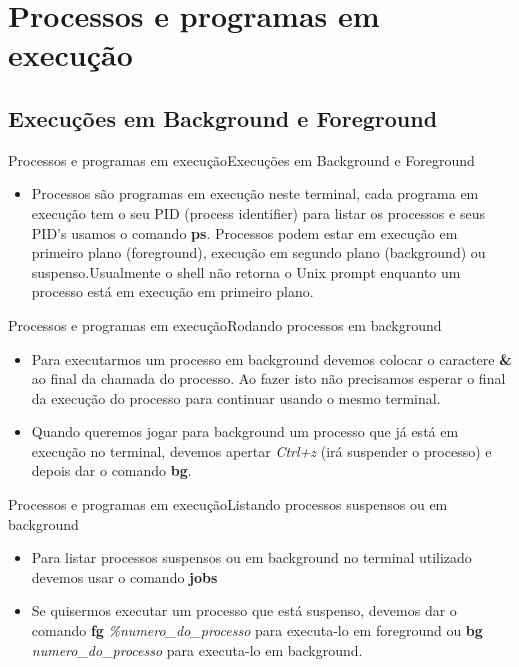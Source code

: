 \documentclass{beamer}
\begin{document}
\section{Processos e programas em execu\c{c}ão}
\subsection{Execu\c{c}ões em Background e Foreground}
\begin{frame}{Processos e programas em execu\c{c}ão}{Execu\c{c}ões em Background e Foreground}
  \begin{itemize}
  \item { Processos são programas em execu\c{c}ão neste terminal, cada programa em execu\c{c}ão tem o seu PID (process identifier) para listar os processos e seus PID's usamos o comando \textbf{ps}. Processos podem estar em execu\c{c}ão em primeiro plano (foreground), execu\c{c}ão em segundo plano (background) ou suspenso.Usualmente o shell não retorna o Unix prompt enquanto um processo está em execu\c{c}ão em primeiro plano.
    }\end{itemize}
\end{frame}

\begin{frame}{Processos e programas em execu\c{c}ão}{Rodando processos em background}
  \begin{itemize}
  \item {Para executarmos um processo em background devemos colocar o caractere \textbf{\&} ao final da chamada do processo. Ao fazer isto não precisamos esperar o final da execu\c{c}ão do processo para continuar usando o mesmo terminal.}
  \item {Quando queremos jogar para background um processo que já está em execu\c{c}ão no terminal, devemos apertar \textit{Ctrl+z} (irá suspender o processo) e depois dar o comando \textbf{bg}.}
  \end{itemize}
\end{frame}

\begin{frame}{Processos e programas em execu\c{c}ão}{Listando processos suspensos ou em background}
  \begin{itemize}
  \item {Para listar processos suspensos ou em background no terminal utilizado devemos usar o comando \textbf{jobs}}
  \item {Se quisermos executar um processo que está suspenso, devemos dar o comando \textbf{fg}\textit{ \%numero\_do\_processo} para executa-lo em foreground ou \textbf{bg}\textit{ numero\_do\_processo} para executa-lo em background.}
  \end{itemize}
\end{frame}
\end{document}
